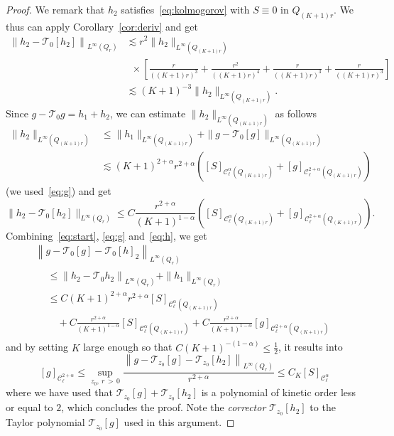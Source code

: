 \documentclass[AHL,Unicode,longabstracts,published]{cedram}
\newcommand{\cC}{\mathcal{C}}
\newcommand{\cT}{\mathcal{T}}
\begin{document}
\begin{proof}
We remark that $h_2$ satisfies~\eqref{eq:kolmogorov} with $S\equiv 0$ in $Q_{(K+1)r}$. We thus can apply Corollary~\ref{cor:deriv} and get
\begin{align*}
\left\|h_2 - \cT_{0}[h_2]\right\|_{L^\infty(Q_r)} & \lesssim r^2 \|h_2\|_{L^\infty\left(Q_{(K+1)r}\right)}  \\
& \;\:\times \left[\frac{r}{((K+1)r)^3} + \frac{r^2}{((K+1)r)^4}+\frac{r}{((K+1)r)^3}+\frac{r}{((K+1)r)^3}\right]
\\
& \lesssim (K+1)^{-3} \|h_2\|_{L^\infty\left(Q_{(K+1)r}\right)}.
\end{align*}
Since $g-\cT_{0} g = h_1 +h_2$, we can estimate $\|h_2\|_{L^\infty(Q_{(K+1)r})}$ as follows
\begin{align*}
\|h_2\|_{L^\infty\left(Q_{(K+1)r}\right)} &\le \|h_1\|_{L^\infty\left(Q_{(K+1)r}\right)} + \|g - \cT_{0}[g] \|_{L^\infty\left(Q_{(K+1)r}\right)} \\
& \lesssim (K+1)^{2+\alpha} r^{2+\alpha} \left([S]_{\cC_\ell^{\alpha}\left(Q_{(K+1)r}\right)} + [g]_{\cC_\ell^{2+\alpha}\left(Q_{(K+1)r}\right)} \right)
\end{align*}
(we used~\eqref{eq:g}) and get
\begin{equation}\label{eq:h}
\|h_2 -\cT_{0}[h_2]\|_{L^\infty(Q_r)} \le C
\frac{r^{2+\alpha}}{(K+1)^{1-\alpha}}
\left([S]_{\cC_\ell^{\alpha}\left(Q_{(K+1)r}\right)} + [g]_{\cC_\ell^{2+\alpha}\left(Q_{(K+1)r}\right)}\right).
\end{equation}
Combining~\eqref{eq:start}, \eqref{eq:g} and~\eqref{eq:h}, we get
\begin{multline*}
\left\| g - \cT_{0}[g] - \cT_{0} [h]_2 \right\|_{L^\infty(Q_r)} \\
\begin{aligned}
& \le \left\| h_2 - \cT_{0} h_2 \right\|_{L^\infty(Q_r)} + \| h_1\|_{L^\infty(Q_r)} \\
& \le C (K+1)^{2+\alpha} r^{2+\alpha} [S]_{\cC_\ell^{\alpha}\left(Q_{(K+1)r}\right)} \\
& \quad + C \frac{r^{2+\alpha}}{(K+1)^{1-\alpha}} [S]_{\cC_\ell^{\alpha}\left(Q_{(K+1)r}\right)} + C \frac{r^{2+\alpha}}{(K+1)^{1-\alpha}} [g]_{\cC_\ell^{2+\alpha}\left(Q_{(K+1)r}\right)}
\end{aligned}
\end{multline*}
and by setting $K$ large enough so that $C (K+1)^{-(1-\alpha)} \le \frac12$, it results into
\[
[g]_{\cC_\ell^{2+\alpha}} \le \sup_{z_0,\:r\,>\,0} \frac{ \left\| g -
\cT_{z_0}[g] - \cT_{z_0}[h_2]
\right\|_{L^\infty(Q_r)}}{r^{2+\alpha}} \le C_K [S]_{\cC_\ell^{\alpha}}
\]
where we have used that $\cT_{z_0}[g] + \cT_{z_0}[h_2]$ is a polynomial of kinetic order less or equal to $2$, which concludes the proof. Note the \emph{corrector} $\cT_{z_0}[h_2]$ to the Taylor polynomial $\cT_{z_0}[g]$ used in this argument.
\end{proof}
\end{document}
